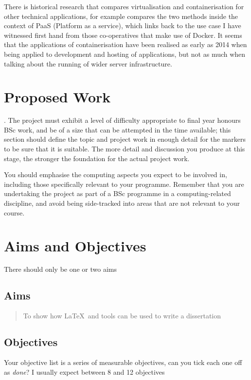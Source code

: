 There is historical research that compares virtualisation and containerisation for other technical applications, for example \citep{dua14} compares the two methods inside the context of PaaS (Platform as a service), which links back to the use case I have witnessed first hand from those co-operatives that make use of Docker. It seems that the applications of containerisation have been realised as early as 2014 when being applied to development and hosting of applications, but not as much when talking about the running of wider server infrastructure. 

\section{Proposed Work}
\label{proposed}
.  The project must exhibit a level of difficulty appropriate to final year honours BSc work, and be of a size that can be attempted in the time available; this section should define the topic and project work in enough detail for the markers to be sure that it is suitable. The more detail and discussion you produce at this stage, the stronger the foundation for the actual project work.

You should emphasise the computing aspects you expect to be involved in, including those specifically relevant to your programme.  Remember that you are undertaking the project as part of a BSc programme in a computing-related discipline, and avoid being side-tracked into areas that are not relevant to your course.

\section{Aims and Objectives}
There should only be one or two aims
\subsection{Aims}
\begin{quote}
	To show how \LaTeX\ and tools can be used to write a dissertation
\end{quote}

\subsection{Objectives}
Your objective list is a series of measurable objectives, can you tick each one off as \emph{done}?  I usually expect between 8 and 12 objectives

